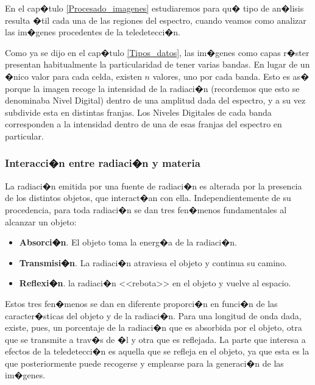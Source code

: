 
En el cap�tulo \ref{Procesado_imagenes} estudiaremos para qu� tipo de an�lisis resulta �til cada una de las regiones del espectro, cuando veamos como analizar las im�genes procedentes de la teledetecci�n.

Como ya se dijo en el cap�tulo \ref{Tipos_datos}, las im�genes como capas r�ster presentan habitualmente la particularidad de tener varias bandas. En lugar de un �nico valor para cada celda, existen $n$ valores, uno por cada banda. Esto es as� porque la imagen recoge la intensidad de la radiaci�n (recordemos que esto se denominaba Nivel Digital) dentro de una amplitud dada del espectro, y a su vez subdivide esta en distintas franjas. Los Niveles Digitales de cada banda corresponden a la intensidad dentro de una de esas franjas del espectro en particular.

\subsubsection{Interacci�n entre radiaci�n y materia}

La radiaci�n emitida por una fuente de radiaci�n es alterada por la presencia de los distintos objetos, que interact�an con ella. Independientemente de su procedencia, para toda radiaci�n se dan tres fen�menos fundamentales al alcanzar un objeto:

\begin{itemize}
	\item \textbf{Absorci�n}. El objeto toma la energ�a de la radiaci�n.
	\item \textbf{Transmisi�n}. La radiaci�n atraviesa el objeto y continua su camino.
	\item \textbf{Reflexi�n}. la radiaci�n <<rebota>> en el objeto y vuelve al espacio.	
\end{itemize}


Estos tres fen�menos se dan en diferente proporci�n en funci�n de las caracter�sticas del objeto y de la radiaci�n. Para una longitud de onda dada, existe, pues, un porcentaje de la radiaci�n que es absorbida por el objeto, otra que se transmite a trav�s de �l y otra que es reflejada. La parte que  interesa a efectos de la teledetecci�n es aquella que se refleja en el objeto, ya que esta es la que posteriormente puede recogerse y emplearse para la generaci�n de las im�genes.

